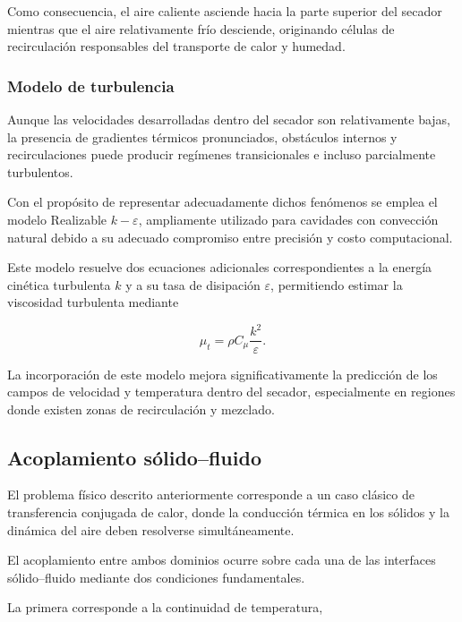 Como consecuencia, el aire caliente asciende hacia la parte superior del secador mientras que el aire relativamente frío desciende, originando células de recirculación responsables del transporte de calor y humedad.

\subsubsection{Modelo de turbulencia}

Aunque las velocidades desarrolladas dentro del secador son relativamente bajas, la presencia de gradientes térmicos pronunciados, obstáculos internos y recirculaciones puede producir regímenes transicionales e incluso parcialmente turbulentos.

Con el propósito de representar adecuadamente dichos fenómenos se emplea el modelo Realizable $k-\varepsilon$, ampliamente utilizado para cavidades con convección natural debido a su adecuado compromiso entre precisión y costo computacional.

Este modelo resuelve dos ecuaciones adicionales correspondientes a la energía cinética turbulenta $k$ y a su tasa de disipación $\varepsilon$, permitiendo estimar la viscosidad turbulenta mediante

\begin{equation}
\mu_t
=
\rho
C_\mu
\frac{k^2}{\varepsilon}.
\end{equation}

La incorporación de este modelo mejora significativamente la predicción de los campos de velocidad y temperatura dentro del secador, especialmente en regiones donde existen zonas de recirculación y mezclado.

\subsection{Acoplamiento sólido--fluido}

El problema físico descrito anteriormente corresponde a un caso clásico de transferencia conjugada de calor, donde la conducción térmica en los sólidos y la dinámica del aire deben resolverse simultáneamente.

El acoplamiento entre ambos dominios ocurre sobre cada una de las interfaces sólido--fluido mediante dos condiciones fundamentales.

La primera corresponde a la continuidad de temperatura,

